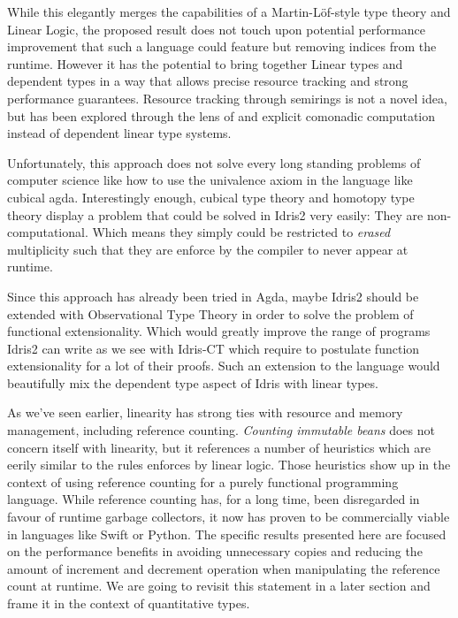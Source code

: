 \documentclass[
]{article}
\begin{document}
While this elegantly merges the capabilities of a Martin-Löf-style type
theory\cite{martin-lof} and Linear Logic\cite{linear-logic}, the
proposed result does not touch upon potential performance improvement
that such a language could feature but removing indices from the
runtime\cite{store_indices}. However it has the potential to bring
together Linear types and dependent types in a way that allows precise
resource tracking and strong performance guarantees. Resource tracking
through semirings is not a novel idea, but has been explored through the
lens of and explicit comonadic computation \cite{parametric_effects}
instead of dependent linear type systems.

Unfortunately, this approach does not solve every long standing problems
of computer science like how to use the univalence axiom in the language
like cubical agda\cite{cubical_agda}. Interestingly enough, cubical type
theory and homotopy type theory display a problem that could be solved
in Idris2 very easily: They are non-computational. Which means they
simply could be restricted to \emph{erased} multiplicity such that they
are enforce by the compiler to never appear at runtime.

Since this approach has already been tried in Agda\cite{agda}, maybe
Idris2 should be extended with Observational Type Theory \cite{ott} in
order to solve the problem of functional extensionality. Which would
greatly improve the range of programs Idris2 can write as we see with
Idris-CT\cite{idris-ct} which require to postulate function
extensionality for a lot of their proofs. Such an extension to the
language would beautifully mix the dependent type aspect of Idris with
linear types.

As we've seen earlier, linearity has strong ties with resource and
memory management, including reference counting. \emph{Counting
immutable beans}\cite{immutable_beans} does not concern itself with
linearity, but it references a number of heuristics which are eerily
similar to the rules enforces by linear logic. Those heuristics show up
in the context of using reference counting for a purely functional
programming language. While reference counting has, for a long time,
been disregarded in favour of runtime garbage collectors, it now has
proven to be commercially viable in languages like Swift or Python. The
specific results presented here are focused on the performance benefits
in avoiding unnecessary copies and reducing the amount of increment and
decrement operation when manipulating the reference count at runtime. We
are going to revisit this statement in a later section and frame it in
the context of quantitative types.
\end{document}
